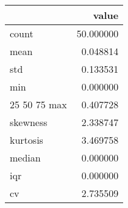 \begin{tabular}{lr}
\toprule
 & value \\
\midrule
count & 50.000000 \\
mean & 0.048814 \\
std & 0.133531 \\
min & 0.000000 \\
25%
50%
75%
max & 0.407728 \\
skewness & 2.338747 \\
kurtosis & 3.469758 \\
median & 0.000000 \\
iqr & 0.000000 \\
cv & 2.735509 \\
\bottomrule
\end{tabular}
